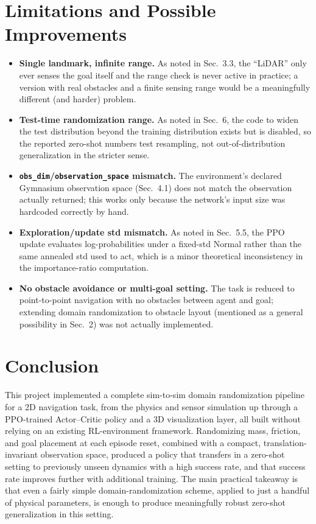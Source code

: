 \documentclass[11pt]{article}
\begin{document}
\section*{Limitations and Possible Improvements}
\begin{itemize}[leftmargin=*]
  \item \textbf{Single landmark, infinite range.} As noted in Sec.~3.3, the ``LiDAR'' only ever senses
  the goal itself and the range check is never active in practice; a version with real obstacles and a
  finite sensing range would be a meaningfully different (and harder) problem.
  \item \textbf{Test-time randomization range.} As noted in Sec.~6, the code to widen the test
  distribution beyond the training distribution exists but is disabled, so the reported zero-shot
  numbers test resampling, not out-of-distribution generalization in the stricter sense.
  \item \textbf{\texttt{obs\_dim}/\texttt{observation\_space} mismatch.} The environment's declared
  Gymnasium observation space (Sec.~4.1) does not match the observation actually returned; this works
  only because the network's input size was hardcoded correctly by hand.
  \item \textbf{Exploration/update std mismatch.} As noted in Sec.~5.5, the PPO update evaluates
  log-probabilities under a fixed-std Normal rather than the same annealed std used to act, which is a
  minor theoretical inconsistency in the importance-ratio computation.
  \item \textbf{No obstacle avoidance or multi-goal setting.} The task is reduced to point-to-point
  navigation with no obstacles between agent and goal; extending domain randomization to obstacle layout
  (mentioned as a general possibility in Sec.~2) was not actually implemented.
\end{itemize}

\section{Conclusion}

This project implemented a complete sim-to-sim domain randomization pipeline for a 2D navigation task,
from the physics and sensor simulation up through a PPO-trained Actor--Critic policy and a 3D
visualization layer, all built without relying on an existing RL-environment framework. Randomizing mass,
friction, and goal placement at each episode reset, combined with a compact, translation-invariant
observation space, produced a policy that transfers in a zero-shot setting to previously unseen dynamics
with a high success rate, and that success rate improves further with additional training. The main
practical takeaway is that even a fairly simple domain-randomization scheme, applied to just a handful of
physical parameters, is enough to produce meaningfully robust zero-shot generalization in this setting.
\end{document}
